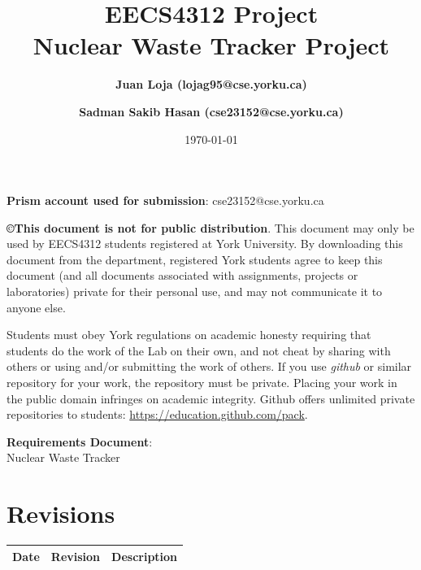 \documentclass[fontsize=12pt,paper=letter,twoside]{scrartcl}
\author{\textbf{Juan Loja (lojag95@cse.yorku.ca)}
\and \textbf{Sadman Sakib Hasan (cse23152@cse.yorku.ca)}
}
\date{\today} %
\begin{document}
\title{EECS4312 Project\\Nuclear Waste Tracker Project}
\maketitle

\noindent \textbf{Prism account used for submission}: cse23152@cse.yorku.ca

\begin {mdframed}
\textbf{\copyright This document is not for public distribution}. This document may only be used by EECS4312 students registered at York University. By downloading this document from the department, registered York students agree to keep this document (and all documents associated with assignments, projects or laboratories) private for their personal use, and may not communicate it to anyone else. 

Students must obey York regulations on academic honesty requiring that students do the work of the Lab on their own, and not cheat by sharing with others or using and/or submitting the work of others. If you use \textit{github} or similar repository for your work,  the repository must be private. Placing your work in the public domain infringes on academic integrity. Github offers unlimited private repositories to students: \url{https://education.github.com/pack}.

\end {mdframed}

\newpage

\vspace*{2in}
\begin{center}
\huge{\textbf{Requirements Document}:\\ Nuclear Waste Tracker}
\end{center}

\bigskip\bigskip

\section*{Revisions}

\begin{tabular}{|l|l|p{3in}|}
\hline
Date & Revision& Description \\ 
\hline
\hline
\hline
\end{tabular}

\newpage
\end{document}
